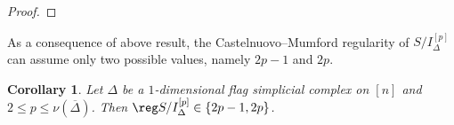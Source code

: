 \documentclass[12pt]{amsart}
\newtheorem{Corollary}[Theorem]{Corollary}
\begin{document}
\begin{proof}



    

\end{proof}

As a consequence of above result, the Castelnuovo--Mumford regularity of $S/I_{\Delta}^{[p]}$ can assume
only two possible values, namely $2p-1$ and $2p$.


\begin{Corollary}\label{Coro:reg}
Let $\Delta$ be a $1$-dimensional flag simplicial complex on $[n]$ and $2\leq p\leq \nu(\overline{\Delta})$. Then
$\reg S/I_{\Delta}^{[p]} \in \{2p-1,2p\}$.
\end{Corollary}
\end{document}
